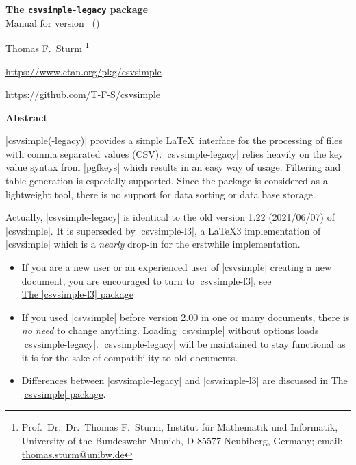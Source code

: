 \documentclass[a4paper,11pt]{ltxdoc}
\begin{document}
\begin{center}
\begin{tcolorbox}[enhanced,hbox,tikznode,left=8mm,right=8mm,boxrule=0.4pt,
  colback=white,colframe=black!50!yellow,
  drop lifted shadow=black!50!yellow,arc is angular,
  before=\par\vspace*{5mm},after=\par\bigskip]
{\bfseries\LARGE The \texttt{csvsimple-legacy} package}\\[3mm]
{\large Manual for version \version\ (\datum)}
\end{tcolorbox}
{\large Thomas F.~Sturm%
  \footnote{Prof.~Dr.~Dr.~Thomas F.~Sturm, Institut f\"{u}r Mathematik und Informatik,
    University of the Bundeswehr Munich, D-85577 Neubiberg, Germany;
     email: \href{mailto:thomas.sturm@unibw.de}{thomas.sturm@unibw.de}}\par\medskip
\normalsize\url{https://www.ctan.org/pkg/csvsimple}\par
\url{https://github.com/T-F-S/csvsimple}
}
\end{center}
\bigskip
\begin{absquote}
  \begin{center}\bfseries Abstract\end{center}
  |csvsimple(-legacy)| provides a simple \LaTeX\ interface for the processing of files with
  comma separated values (CSV). |csvsimple-legacy| relies heavily on the key value
  syntax from |pgfkeys| which results in an easy way of usage.
  Filtering and table generation is especially supported. Since the package
  is considered as a lightweight tool, there is no support for data sorting
  or data base storage.
\end{absquote}


\begin{tcolorbox}[enhanced,left=8mm,right=8mm,boxrule=2pt,boxsep=3mm,
  colback=red!85!gray!5!white,colframe=red!85!gray,
  arc is angular,arc=5mm,
  before skip=1cm]
Actually, |csvsimple-legacy| is identical to the old version 1.22 (2021/06/07)
of |csvsimple|. It is superseded by |csvsimple-l3|, a \LaTeX3 implementation
of |csvsimple| which is a \emph{nearly} drop-in for the erstwhile implementation.
\begin{itemize}
\item If you are a new user or an experienced user of |csvsimple| creating a
  new document, you are encouraged to turn to |csvsimple-l3|, see\\
  \href{csvsimple-l3.pdf}{\flqq The |csvsimple-l3| package\frqq}
\item If you used |csvsimple| before version 2.00 in one or many documents,
  there is \emph{no need} to change anything. Loading |csvsimple|
  without options loads |csvsimple-legacy|.
  |csvsimple-legacy| will be maintained to stay functional as it is for the
  sake of compatibility to old documents.
\item Differences between |csvsimple-legacy| and |csvsimple-l3| are
  discussed in \href{csvsimple.pdf}{\flqq The |csvsimple| package\frqq}.
\end{itemize}
\end{tcolorbox}
\end{document}
